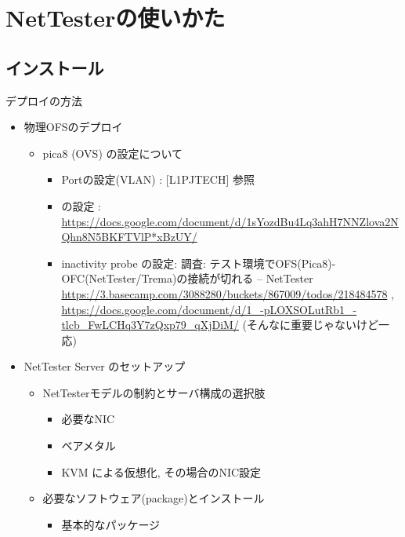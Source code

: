 
\chapter{NetTesterの使いかた}

\section{インストール}

デプロイの方法

\begin{itemize}
 \item 物理OFSのデプロイ
       \begin{itemize}
        \item pica8 (OVS) の設定について
              \begin{itemize}
               \item Portの設定(VLAN) : [L1PJTECH] 参照
               \item {} の設定 : \url{https://docs.google.com/document/d/1sYozdBu4Lq3ahH7NNZlova2NQhn8N5BKFTVlP*xBzUY/}
               \item inactivity probe の設定: 調査: テスト環境でOFS(Pica8)-OFC(NetTester/Trema)の接続が切れる – NetTester \url{https://3.basecamp.com/3088280/buckets/867009/todos/218484578} , \url{https://docs.google.com/document/d/1_-pLOXSOLutRb1_-tlcb_FwLCHq3Y7zQxp79_qXjDiM/}
                     (そんなに重要じゃないけど一応)
              \end{itemize}
       \end{itemize}
 \item NetTester Server のセットアップ
       \begin{itemize}
        \item NetTesterモデルの制約とサーバ構成の選択肢
              \begin{itemize}
               \item 必要なNIC
               \item ベアメタル
               \item KVM による仮想化, その場合のNIC設定
              \end{itemize}
        \item 必要なソフトウェア(package)とインストール
              \begin{itemize}
               \item 基本的なパッケージ
                     \begin{itemize}

\end{itemize}
\end{itemize}
\end{itemize}
\end{itemize}
